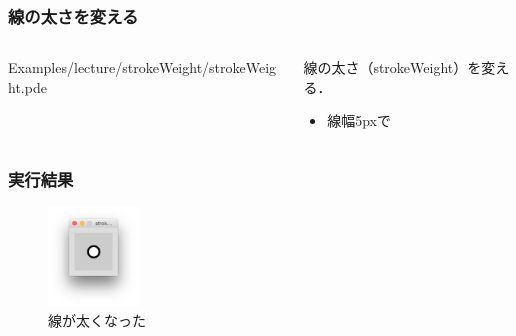 \documentclass[dvipdfmx]{beamer}
\begin{document}
        \begin{frame}
            \frametitle{線の太さを変える}
            \begin{columns}[c]
                \begin{column}{0.50\textwidth}
                    \tiny
                    Examples/lecture/strokeWeight/strokeWeight.pde
                    \scriptsize
                \end{column}
                \begin{column}{0.50\textwidth}
                    \begin{block}{線の太さ（strokeWeight）を変える．}
                        \begin{itemize}
                            \item 線幅5pxで
                        \end{itemize}
                    \end{block}
                \end{column}
            \end{columns}
        \end{frame}

        \begin{frame}
            \frametitle{実行結果}
                \begin{figure}[htb]
                    \includegraphics[width=24mm]{images/08.png}
                    \caption{線が太くなった}
                    \label{fig:08}
                \end{figure}
        \end{frame}
\end{document}
